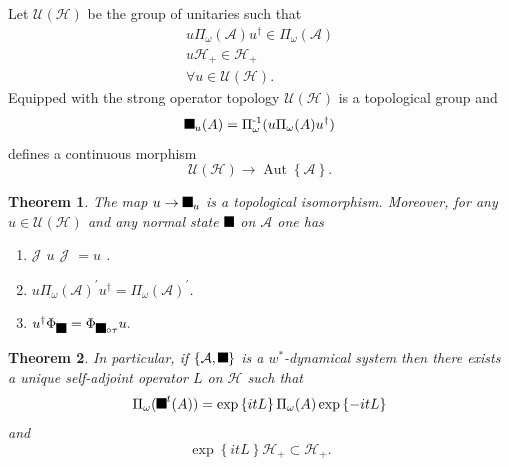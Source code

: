 \documentclass[aps,preprint]{revtex4}%
\providecommand{\U}[1]{\protect\rule{.1in}{.1in}}
\newtheorem{theorem}{Theorem}
\begin{document}
Let $\mathcal{U}\left(  \mathcal{H}\right)  $ be the group of unitaries such
that
\begin{gather}
u\Pi_{\omega}(\mathcal{A})u^{\dagger}\in\Pi_{\omega}(\mathcal{A})\\
u\mathcal{H}_{+}\in\mathcal{H}_{+}\\
\forall u\in\mathcal{U}\left(  \mathcal{H}\right)  .
\end{gather}
Equipped with the strong operator topology $\mathcal{U}\left(  \mathcal{H}%
\right)  $ is a topological group and
\begin{equation}
\U{3c4} _{u}(A)=\Pi_{\omega}^{\text{-}1}(u\Pi_{\omega}(A)u^{\dagger})
\end{equation}
defines a continuous morphism%
\begin{equation}
\mathcal{U}\left(  \mathcal{H}\right)  \rightarrow\operatorname{Aut}\left\{
\mathcal{A}\right\}  .
\end{equation}


\begin{theorem}
The map $u\rightarrow\U{3c4} _{u}$ is a topological isomorphism. Moreover, for
any $u\in\mathcal{U}\left(  \mathcal{H}\right)  $ and \emph{any normal state}
$\U{3c9} $ on $\mathcal{A}$ one has

\begin{enumerate}
\item $\mathcal{J}$ $u$ $\mathcal{J}$ $=u$ .

\item $u\Pi_{\omega}(\mathcal{A})^{\prime}u^{\dagger}=\Pi_{\omega}%
(\mathcal{A})^{\prime}$.

\item $u^{\dagger}\Phi_{\U{3c9} }=\Phi_{\U{3c9} \circ\tau}u.$
\end{enumerate}
\end{theorem}

\begin{theorem}
In particular, if $\left\{  \mathcal{A},\U{3c4} \right\}  $ is a $w^{\ast}%
$-dynamical system then there exists a unique self-adjoint operator $L$ on
$\mathcal{H}$ such that
\begin{equation}
\Pi_{\omega}(\U{3c4} ^{t}(A))=\exp\left\{  itL\right\}  \Pi_{\omega}%
(A)\exp\left\{  -itL\right\}
\end{equation}
and
\begin{equation}
\exp\left\{  itL\right\}  \mathcal{H}_{+}\subset\mathcal{H}_{+}.
\end{equation}

\end{theorem}
\end{document}
